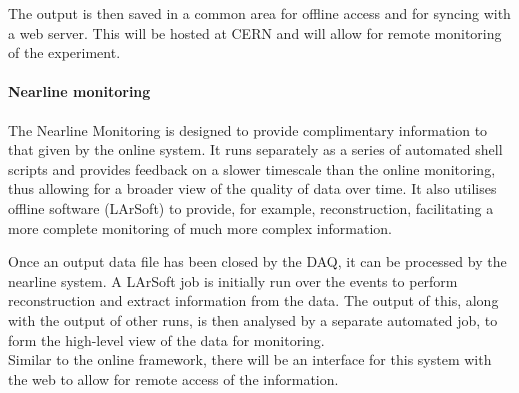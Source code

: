 The output is then saved in a common area for offline access and for syncing
with a web server. This will be hosted at CERN and will allow for remote
monitoring of the experiment.

\paragraph{Nearline monitoring}

The Nearline Monitoring is designed to provide complimentary information to
that given by the online system. It runs separately as a series of automated
shell scripts and provides feedback on a slower timescale than the online
monitoring, thus allowing for a broader view of the quality of data over time.
It also utilises offline software (LArSoft) to provide, for example,
reconstruction, facilitating a more complete monitoring of much more complex
information.

Once an output data file has been closed by the DAQ, it can be processed by the
nearline system.  A LArSoft job is initially run over the events to perform
reconstruction and extract information from the data.  The output of this,
along with the output of other runs, is then analysed by a separate automated
job, to form the high-level view of the data for monitoring.\\
%
Similar to the online framework, there will be an interface for this system
with the web to allow for remote access of the information.


